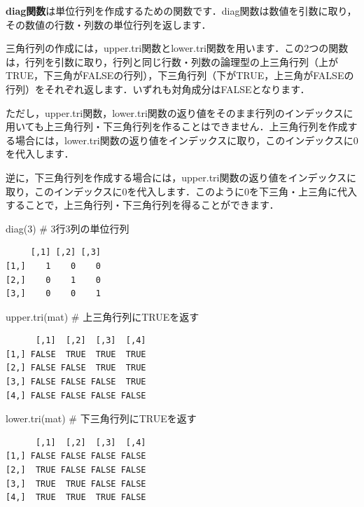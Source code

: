 \documentclass[
  letterpaper,
  DIV=11,
  numbers=noendperiod]{scrreprt}
\newenvironment{Shaded}{\begin{snugshade}}{\end{snugshade}}
\newcommand{\CommentTok}[1]{\textcolor[rgb]{0.37,0.37,0.37}{#1}}
\newcommand{\DecValTok}[1]{\textcolor[rgb]{0.68,0.00,0.00}{#1}}
\newcommand{\FunctionTok}[1]{\textcolor[rgb]{0.28,0.35,0.67}{#1}}
\newcommand{\NormalTok}[1]{\textcolor[rgb]{0.00,0.23,0.31}{#1}}
\begin{document}
\textbf{diag関数}は単位行列を作成するための関数です．diag関数は数値を引数に取り，その数値の行数・列数の単位行列を返します．

三角行列の作成には，upper.tri関数とlower.tri関数を用います．この2つの関数は，行列を引数に取り，行列と同じ行数・列数の論理型の上三角行列（上がTRUE，下三角がFALSEの行列），下三角行列（下がTRUE，上三角がFALSEの行列）をそれぞれ返します．いずれも対角成分はFALSEとなります．

ただし，upper.tri関数，lower.tri関数の返り値をそのまま行列のインデックスに用いても上三角行列・下三角行列を作ることはできません．上三角行列を作成する場合には，lower.tri関数の返り値をインデックスに取り，このインデックスに0を代入します．

逆に，下三角行列を作成する場合には，upper.tri関数の返り値をインデックスに取り，このインデックスに0を代入します．このように0を下三角・上三角に代入することで，上三角行列・下三角行列を得ることができます．

\begin{Shaded}
\begin{Highlighting}[]
\FunctionTok{diag}\NormalTok{(}\DecValTok{3}\NormalTok{) }\CommentTok{\# 3行3列の単位行列}
\end{Highlighting}
\end{Shaded}

\begin{verbatim}
     [,1] [,2] [,3]
[1,]    1    0    0
[2,]    0    1    0
[3,]    0    0    1
\end{verbatim}

\begin{Shaded}
\begin{Highlighting}[]
\FunctionTok{upper.tri}\NormalTok{(mat) }\CommentTok{\# 上三角行列にTRUEを返す}
\end{Highlighting}
\end{Shaded}

\begin{verbatim}
      [,1]  [,2]  [,3]  [,4]
[1,] FALSE  TRUE  TRUE  TRUE
[2,] FALSE FALSE  TRUE  TRUE
[3,] FALSE FALSE FALSE  TRUE
[4,] FALSE FALSE FALSE FALSE
\end{verbatim}

\begin{Shaded}
\begin{Highlighting}[]
\FunctionTok{lower.tri}\NormalTok{(mat) }\CommentTok{\# 下三角行列にTRUEを返す}
\end{Highlighting}
\end{Shaded}

\begin{verbatim}
      [,1]  [,2]  [,3]  [,4]
[1,] FALSE FALSE FALSE FALSE
[2,]  TRUE FALSE FALSE FALSE
[3,]  TRUE  TRUE FALSE FALSE
[4,]  TRUE  TRUE  TRUE FALSE
\end{verbatim}
\end{document}
